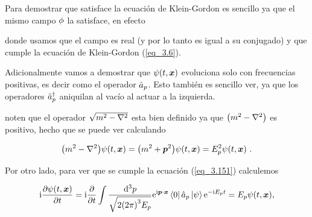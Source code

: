Para demostrar que satisface la ecuación de Klein-Gordon es sencillo ya que el mismo campo $\phi$ la satisface, en efecto

\newcommand{\OKG}{\qty( \square + m^2 )}


donde usamos que el campo es real (y por lo tanto es igual a su conjugado) y que cumple la ecuación de Klein-Gordon (\ref{eq_3.6}).

Adicionalmente vamos a demostrar que $\psi(t,\vb*{x})$ evoluciona solo con frecuencias positivas, es decir como el operador $\hat{a}_p$.  Esto también es sencillo  ver, ya que los operadores $\hat{a}^\dag_p$ aniquilan al vacío al actuar a la izquierda.


noten que el operador $\sqrt{m^2 - \laplacian}$ esta bien definido ya que $\qty(m^2-\laplacian)$ es positivo, hecho que se puede ver calculando 

\begin{equation}
	\qty(m^2-\laplacian ) \psi(t,\vb*{x}) =   \qty(m^2 + \vb*{p}^2) \psi(t,\vb*{x})  = E_p^2 \psi(t,\vb*{x})~.
	\label{eq_3.154}
\end{equation}

Por otro lado, para ver que se cumple la ecuación (\ref{eq_3.151}) calculemos

\begin{equation}
	\mathrm{i} \pdv{\psi (t,\vb*{x})}{t} = \mathrm{i} \pdv{t} \int \frac{\dd[3]{p}}{\sqrt{2\qty(2\pi)^{3}E_p}}  \mathrm{e}^{\mathrm{i} \vb*{p} \cdot \vb*{x}} \bra{0} \hat{a}_p \ket{\psi} \mathrm{e}^{-\mathrm{i} E_p t} = E_p \psi (t,\vb*{x}),
\end{equation}
 
